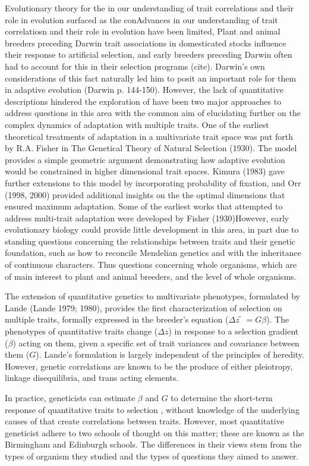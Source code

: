 \documentclass[11pt,one column]{article}
\begin{document}
\begin{multicols}{2}
Evolutionary theory for the in our understanding of trait correlations and their role in evolution surfaced as the conAdvances in our understanding of trait correlatiosn and their role in evolution have been limited, Plant and animal breeders preceding Darwin trait associations in domesticated stocks influence their response to artificial selection, and early breeders preceding Darwin often had to account for this in their selection programs (cite).  Darwin’s own considerations of this fact naturally led him to posit an important role for them in adaptive evolution (Darwin p. 144-150).  However, the lack of quantitative descriptions hindered the exploration of have been two major approaches to address questions in this area with the common aim of elucidating further on the complex dynamics of adaptation with multiple traits. One of the earliest theoretical treatments of adaptation in a multivariate trait space was put forth by R.A. Fisher in The Genetical Theory of Natural Selection (1930). The model provides a simple geometric argument demonstrating how adaptive evolution would be constrained in higher dimensional trait spaces.  Kimura (1983) gave further extensions to this model by incorporating probability of fixation, and Orr (1998, 2000) provided additional insights on the the optimal dimensions that ensured maximum adaptation.  Some of the earliest works that attempted to address multi-trait adaptation were developed by Fisher (1930)However, early evolutionary biology could provide little development in this area, in part due to standing questions concerning the relationships between traits and their genetic foundation, such as how to reconcile Mendelian genetics and with the inheritance of continuous characters. Thus questions concerning whole organisms, which are of main interest to plant and animal breeders, and the level of whole organisms.\par

The extension of quantitative genetics to multivariate phenotypes, formulated by Lande (Lande 1979; 1980), provides the first characterization of selection on multiple traits, formally expressed in the breeder’s equation ($\Delta z ̅=G \beta$). The phenotypes of quantitative traits change ($\Delta z$) in response to a selection gradient ($\beta$) acting on them, given a specific set of trait variances and covariance between them ($G$). Lande’s formulation is largely independent of the principles of heredity.  However, genetic correlations are known to be the produce of either pleiotropy, linkage disequilibria, and trans acting elements.\par
In practice, geneticists can estimate $\beta$ and $G$ to determine the short-term response of quantitative traits to selection \cite{lynch1998genetics}, without knowledge of the underlying causes of that create correlations between traits.  However, most quantitative geneticist adhere to two schools of thought on this matter; these are known as the Birmingham and Edinburgh schools.  The differences in their views stem from the types of organism they studied and the types of questions they aimed to answer.\par


\end{multicols}
\end{document}
